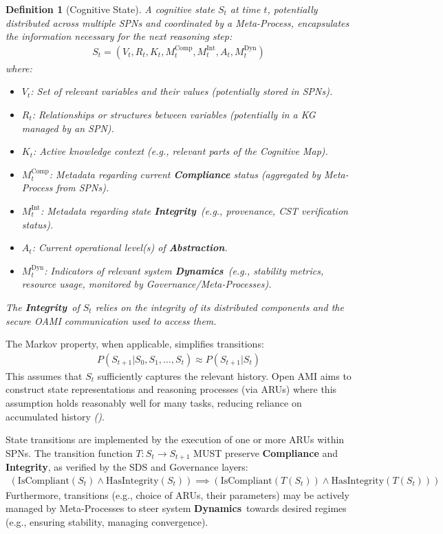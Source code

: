 \documentclass[12pt,a4paper]{report}
\renewcommand{\citep}[1]{\textit{\scriptsize{(\cite{#1})}}}
\newtheorem{definition}{Definition}[section]
\newcommand{\Integrity}{\textbf{Integrity}}
\newcommand{\Abstraction}{\textbf{Abstraction}}
\newcommand{\Dynamics}{\textbf{Dynamics}}
\begin{document}
	\begin{definition}[Cognitive State]
		\label{def:cognitive_state}
		A cognitive state $S_t$ at time $t$, potentially distributed across multiple SPNs and coordinated by a Meta-Process, encapsulates the information necessary for the next reasoning step:
		\begin{align}
			S_t = (V_t, R_t, K_t, M_t^{\text{Comp}}, M_t^{\text{Int}}, A_t, M_t^{\text{Dyn}})
		\end{align}
		where:
		\begin{itemize}
			\item $V_t$: Set of relevant variables and their values (potentially stored in SPNs).
			\item $R_t$: Relationships or structures between variables (potentially in a KG managed by an SPN).
			\item $K_t$: Active knowledge context (e.g., relevant parts of the Cognitive Map).
			\item $M_t^{\text{Comp}}$: Metadata regarding current \textbf{Compliance} status (aggregated by Meta-Process from SPNs).
			\item $M_t^{\text{Int}}$: Metadata regarding state \Integrity\ (e.g., provenance, CST verification status).
			\item $A_t$: Current operational level(s) of \Abstraction.
			\item $M_t^{\text{Dyn}}$: Indicators of relevant system \Dynamics\ (e.g., stability metrics, resource usage, monitored by Governance/Meta-Processes).
		\end{itemize}
		The \Integrity\ of $S_t$ relies on the integrity of its distributed components and the secure OAMI communication used to access them.
	\end{definition}
	
	The Markov property, when applicable, simplifies transitions:
	\begin{align}
		P(S_{t+1}|S_0, S_1, \ldots, S_t) \approx P(S_{t+1}|S_t) \label{eq:markov_approx}
	\end{align}
	This assumes that $S_t$ sufficiently captures the relevant history. Open AMI aims to construct state representations and reasoning processes (via ARUs) where this assumption holds reasonably well for many tasks, reducing reliance on accumulated history \citep{Teng2025AtomOfThoughtsRef}.
	
	State transitions are implemented by the execution of one or more ARUs within SPNs. The transition function $T: S_t \rightarrow S_{t+1}$ MUST preserve \textbf{Compliance} and \Integrity, as verified by the SDS and Governance layers:
	\begin{align}
		(\text{IsCompliant}(S_t) \land \text{HasIntegrity}(S_t)) \implies (\text{IsCompliant}(T(S_t)) \land \text{HasIntegrity}(T(S_t))) \label{eq:transition_preservation}
	\end{align}
	Furthermore, transitions (e.g., choice of ARUs, their parameters) may be actively managed by Meta-Processes to steer system \Dynamics\ towards desired regimes (e.g., ensuring stability, managing convergence).
	
\end{document}

